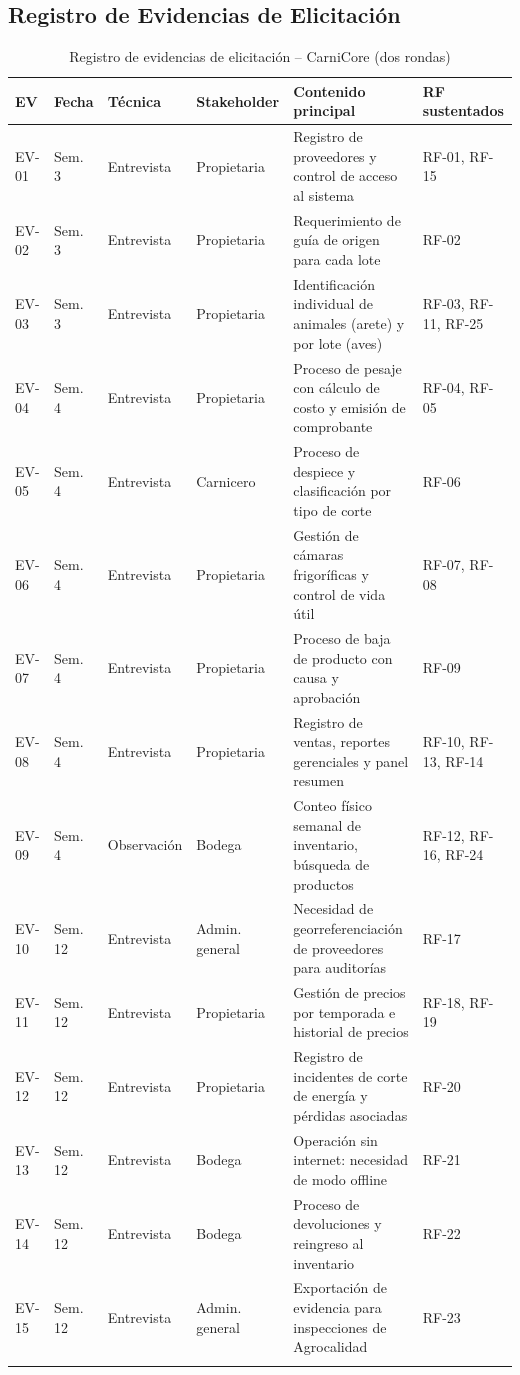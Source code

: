 \documentclass[11pt,a4paper]{article}
\begin{document}
\subsection{Registro de Evidencias de Elicitación}

\begin{longtable}{|p{1cm}|p{2cm}|p{2cm}|p{2.5cm}|p{3cm}|p{3cm}|}
\hline
\textbf{EV} & \textbf{Fecha} & \textbf{Técnica} & \textbf{Stakeholder} & \textbf{Contenido principal} & \textbf{RF sustentados} \\
\hline
EV-01 & Sem. 3 & Entrevista & Propietaria & Registro de proveedores y control de acceso al sistema & RF-01, RF-15 \\
EV-02 & Sem. 3 & Entrevista & Propietaria & Requerimiento de guía de origen para cada lote & RF-02 \\
EV-03 & Sem. 3 & Entrevista & Propietaria & Identificación individual de animales (arete) y por lote (aves) & RF-03, RF-11, RF-25 \\
EV-04 & Sem. 4 & Entrevista & Propietaria & Proceso de pesaje con cálculo de costo y emisión de comprobante & RF-04, RF-05 \\
EV-05 & Sem. 4 & Entrevista & Carnicero & Proceso de despiece y clasificación por tipo de corte & RF-06 \\
EV-06 & Sem. 4 & Entrevista & Propietaria & Gestión de cámaras frigoríficas y control de vida útil & RF-07, RF-08 \\
EV-07 & Sem. 4 & Entrevista & Propietaria & Proceso de baja de producto con causa y aprobación & RF-09 \\
EV-08 & Sem. 4 & Entrevista & Propietaria & Registro de ventas, reportes gerenciales y panel resumen & RF-10, RF-13, RF-14 \\
EV-09 & Sem. 4 & Observación & Bodega & Conteo físico semanal de inventario, búsqueda de productos & RF-12, RF-16, RF-24 \\
EV-10 & Sem. 12 & Entrevista & Admin. general & Necesidad de georreferenciación de proveedores para auditorías & RF-17 \\
EV-11 & Sem. 12 & Entrevista & Propietaria & Gestión de precios por temporada e historial de precios & RF-18, RF-19 \\
EV-12 & Sem. 12 & Entrevista & Propietaria & Registro de incidentes de corte de energía y pérdidas asociadas & RF-20 \\
EV-13 & Sem. 12 & Entrevista & Bodega & Operación sin internet: necesidad de modo offline & RF-21 \\
EV-14 & Sem. 12 & Entrevista & Bodega & Proceso de devoluciones y reingreso al inventario & RF-22 \\
EV-15 & Sem. 12 & Entrevista & Admin. general & Exportación de evidencia para inspecciones de Agrocalidad & RF-23 \\
\hline
\caption{Registro de evidencias de elicitación -- CarniCore (dos rondas)}
\label{tab:evidencias}
\end{longtable}
\end{document}
